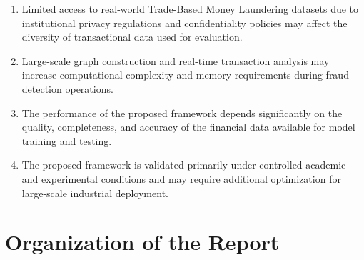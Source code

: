 {\renewcommand{\theenumi}{\roman{enumi}}\renewcommand{\labelenumi}{(\theenumi)}%
\begin{enumerate}
    \item Limited access to real-world Trade-Based Money Laundering datasets due to institutional privacy regulations and confidentiality policies may affect the diversity of transactional data used for evaluation.

    \item Large-scale graph construction and real-time transaction analysis may increase computational complexity and memory requirements during fraud detection operations.

    \item The performance of the proposed framework depends significantly on the quality, completeness, and accuracy of the financial data available for model training and testing.

    \item The proposed framework is validated primarily under controlled academic and experimental conditions and may require additional optimization for large-scale industrial deployment.
\end{enumerate}}

\newpage
\section[Organization of the Report]{\textbf{Organization of the Report}}

